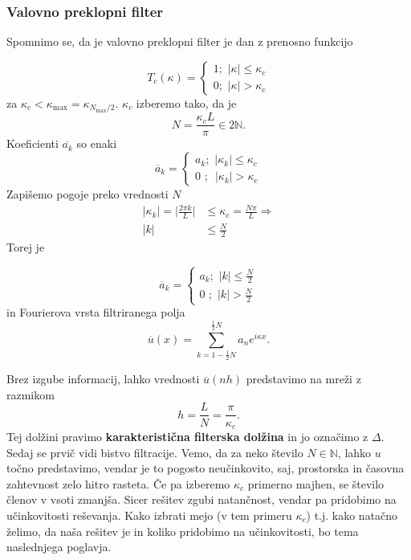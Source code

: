 \documentclass[mat2, tisk]{fmfdelo}
\newcommand{\N}{\mathbb N}
\begin{document}
\subsubsection{Valovno preklopni filter}

Spomnimo se, da je valovno preklopni filter je dan z prenosno funkcijo 

$$
T_c(\kappa)=\begin{cases}
  1 ;\,\, |\kappa| \leq \kappa_c \\
  0 ;\,\, |\kappa| > \kappa_c
\end{cases}
$$
za $\kappa_c < \kappa_\text{max} = \kappa_{N_\text{max}/2}$. $\kappa_c$
izberemo tako, da je 
$$
N = \frac{\kappa_c L}{\pi} \in 2\N.
$$
Koeficienti $\overline{a_k}$ so enaki 
$$
\overline{a}_k=\begin{cases}
  a_k ;\,\, |\kappa_k| \leq \kappa_c \\
  0 \,\,;\,\,\, |\kappa_k| > \kappa_c
\end{cases}
$$
Zapišemo pogoje preko vrednosti $N$
\begin{align*}
|\kappa_k| = \Big| \frac{2\pi k}{L} \Big| &\leq \kappa_c = \frac{N\pi}{L} \Longrightarrow\\[1mm]
|k| &\leq \frac{N}{2}
\end{align*}
Torej je

$$
\overline{a}_k= \begin{cases}a_k ;\,\, |k| \leq \frac{N}{2} \\ 0 \,\,;\,\, |k| > \frac{N}{2}\end{cases}
$$
in Fourierova vrsta filtriranega polja 
\begin{equation}
\label{Fourier_število}
\overline{u}(x) = \sum_{k = 1 - \frac{1}{2}N}^{\frac{1}{2}N} a_n e^{i\kappa x}.
\end{equation}

Brez izgube informacij, lahko vrednosti $\overline{u}(nh)$ predstavimo na mreži 
z razmikom 
\begin{equation}
h = \frac{L}{N} = \frac{\pi}{\kappa_c}.
\end{equation}
Tej dolžini pravimo \textbf{karakteristična filterska dolžina} in jo 
označimo z $\Delta$. 
\noindent
Sedaj se prvič vidi bistvo filtracije. Vemo, da za neko število 
$N\in \N$, lahko $u$ točno predstavimo, vendar je to pogosto neučinkovito, 
saj, prostorska in časovna zahtevnost zelo hitro rasteta. Če pa izberemo
$\kappa_c$ primerno majhen, se število členov v vsoti zmanjša.
Sicer rešitev zgubi natančnost, vendar pa pridobimo na učinkovitosti reševanja. 
Kako izbrati mejo (v tem primeru $\kappa_c$) t.j. kako natačno želimo, 
da naša rešitev je in koliko pridobimo na učinkovitosti, bo tema naslednjega poglavja.
\end{document}
